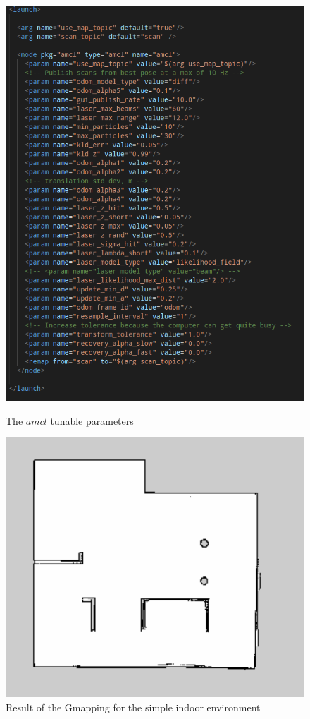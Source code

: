 \documentclass[11pt,a4paper]{article}
\begin{document}
\begin{figure}[!htb]
    \centering
    \begin{minipage}{.5\textwidth}
        \centering
        \includegraphics[width=0.7\linewidth, height=0.2\textheight]{figures/amcl_param}
        \caption{The $amcl$ tunable parameters}
        \label{fig:amcl_param}
    \end{minipage}%
    \begin{minipage}{0.5\textwidth}
        \centering
        \includegraphics[width=0.7\linewidth, height=0.2\textheight]{figures/my_amcl_gmapping}
        \caption{Result of the Gmapping for the simple indoor environment}
        \label{fig:myamcl_map}
    \end{minipage}
 \end{figure}
\end{document}
